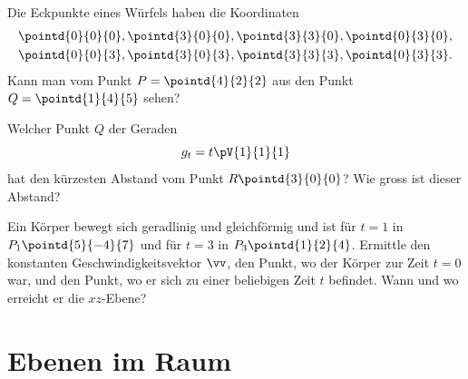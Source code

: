 \documentclass[%
11pt,%
twoside,%
titlepage,%
german,%
headsepline%
]{scrartcl}
\begin{document}
\begin{ueb}
Die Eckpunkte eines Würfels haben die Koordinaten
\begin{align*}
\pointd{0}{0}{0}, \pointd{3}{0}{0}, \pointd{3}{3}{0}, \pointd{0}{3}{0},\\
\pointd{0}{0}{3}, \pointd{3}{0}{3}, \pointd{3}{3}{3}, \pointd{0}{3}{3}.
\end{align*}
Kann man vom Punkt $P=\pointd{4}{2}{2}$ aus den Punkt $Q=\pointd{1}{4}{5}$ sehen?
\end{ueb}

\begin{ueb}[Abstand]
Welcher Punkt $Q$ der Geraden
$$g_t=t\pV{1}{1}{1}$$
hat den kürzesten Abstand vom Punkt $R\pointd{3}{0}{0}$? Wie gross ist dieser Abstand?
\end{ueb}

\begin{ueb}
Ein Körper bewegt sich geradlinig und gleichförmig und ist für $t = 1$ in $P_1\pointd{5}{-4}{7}$ und für $t = 3$ in $P_3\pointd{1}{2}{4}$. Ermittle den konstanten Ge\-schwin\-dig\-keits\-vektor $\vv$, den Punkt, wo der Körper zur Zeit $t = 0$ war, und den Punkt, wo er sich zu einer beliebigen Zeit $t$ befindet. Wann und wo erreicht er die $xz$-Ebene?
\end{ueb}

\section{Ebenen im Raum}
\end{document}
